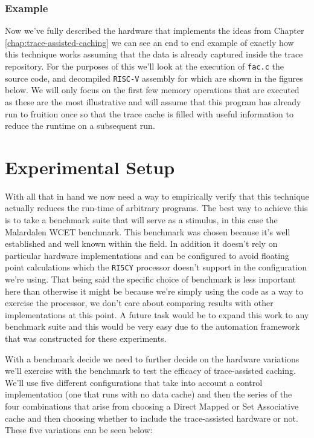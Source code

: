 \subsubsection{Example}

Now we've fully described the hardware that implements the ideas from Chapter \ref{chap:trace-assisted-caching} we can see an end to end example of exactly how this technique works assuming that the data is already captured inside the trace repository. For the purposes of this we'll look at the execution of \texttt{fac.c} the source code, and decompiled \texttt{RISC-V} assembly for which are shown in the figures below. We will only focus on the first few memory operations that are executed as these are the most illustrative and will assume that this program has already run to fruition once so that the trace cache is filled with useful information to reduce the runtime on a subsequent run.


\section{Experimental Setup}

With all that in hand we now need a way to empirically verify that this technique actually reduces the run-time of arbitrary programs. The best way to achieve this is to take a benchmark suite that will serve as a stimulus, in this case the Malardalen WCET \cite{gustafssonMalardalenWCETBenchmarks2010} benchmark. This benchmark was chosen because it's well established and well known within the field. In addition it doesn't rely on particular hardware implementations and can be configured to avoid floating point calculations which the \texttt{RI5CY} processor doesn't support in the configuration we're using. That being said the specific choice of benchmark is less important here than otherwise it might be because we're simply using the code as a way to exercise the processor, we don't care about comparing results with other implementations at this point. A future task would be to expand this work to any benchmark suite and this would be very easy due to the automation framework that was constructed for these experiments.

With a benchmark decide we need to further decide on the hardware variations we'll exercise with the benchmark to test the efficacy of trace-assisted caching. We'll use five different configurations that take into account a control implementation (one that runs with no data cache) and then the series of the four combinations that arise from choosing a Direct Mapped or Set Associative cache and then choosing whether to include the trace-assisted hardware or not. These five variations can be seen below:

